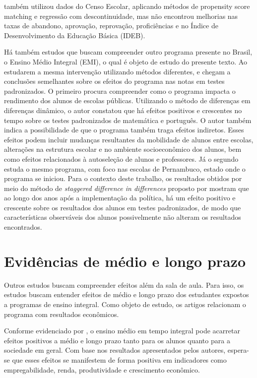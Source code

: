 \cite{Oliveira_2018} também utilizou dados do Censo Escolar, aplicando métodos de propensity score matching e regressão com descontinuidade, mas não encontrou melhorias nas taxas de abandono, aprovação, reprovação, proficiências e no Índice de Desenvolvimento da Educação Básica (IDEB).

Há também estudos que buscam compreender outro programa presente no Brasil, o Ensino Médio Integral (EMI), o qual é objeto de estudo do presente texto. Ao estudarem a mesma intervenção utilizando métodos diferentes, \cite{Kawahara_2019} e \cite{Rosa_2022a} chegam a conclusões semelhantes sobre os efeitos do programa nas notas em testes padronizados. O primeiro procura compreender como o programa impacta o rendimento dos alunos de escolas públicas. Utilizando o método de diferenças em diferenças dinâmico, o autor constatou que há efeitos positivos e crescentes no tempo sobre os testes padronizados de matemática e português. O autor também indica a possibilidade de que o programa também traga efeitos indiretos. Esses efeitos podem incluir mudanças resultantes da mobilidade de alunos entre escolas, alterações na estrutura escolar e no ambiente socioeconômico dos alunos, bem como efeitos relacionados à autoseleção de alunos e professores. Já o segundo estuda o mesmo programa, com foco nas escolas de Pernambuco, estado onde o programa se iniciou. Para o contexto deste trabalho, os resultados obtidos por meio do método de \textit{staggered difference in differences} proposto por \cite{CB_2021} mostram que ao longo dos anos após a implementação da política, há um efeito positivo e crescente sobre os resultados dos alunos em testes padronizados, de modo que características observáveis dos alunos possivelmente não alteram os resultados encontrados. 

\section{Evidências de médio e longo prazo}

Outros estudos buscam compreender efeitos além da sala de aula. Para isso, os estudos buscam entender efeitos de médio e longo prazo dos estudantes expostos a programas de ensino integral. Como objeto de estudo, os artigos relacionam o programa com resultados econômicos.

Conforme evidenciado por \cite{Barros_2022}, o ensino médio em tempo integral pode acarretar efeitos positivos a médio e longo prazo tanto para os alunos quanto para a sociedade em geral. Com base nos resultados apresentados pelos autores, espera-se que esses efeitos se manifestem de forma positiva em indicadores como empregabilidade, renda, produtividade e crescimento econômico.

